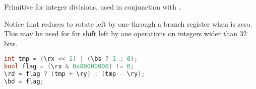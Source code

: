 Primitive for integer divisions, used in conjunction with .

Notice that  reduces to rotate left by one through a branch register
when  is zero. This may be used for for shift left by one
operations on integers wider than 32 bits.

\begin{lstlisting}[numbers=none, basicstyle=\ttfamily\footnotesize, language=C++]
int tmp = (\rx << 1) | (\bs ? 1 : 0);
bool flag = (\rx & 0x80000000) != 0;
\rd = flag ? (tmp + \ry) : (tmp - \ry);
\bd = flag;
\end{lstlisting}
